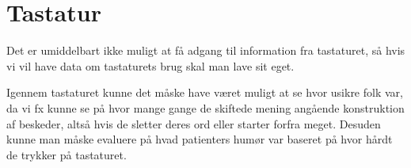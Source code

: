 \section{Tastatur}
Det er umiddelbart ikke muligt at få adgang til information fra tastaturet, så hvis vi vil have data om tastaturets brug skal man lave sit eget.

Igennem tastaturet kunne det måske have været muligt at se hvor usikre folk var, da vi fx kunne se på hvor mange gange de skiftede mening angående konstruktion af beskeder, altså hvis de sletter deres ord eller starter forfra meget.
Desuden kunne man måske evaluere på hvad patienters humør var baseret på hvor hårdt de trykker på tastaturet.

\begin{comment}
Idéer til tastatur:
\begin{description}[style=nextline]
\item[Antal Rettelser]
\item[Ordbrug]
\item[Tid for en sætning]
\item[Tryk niveau]
\end{description}

Sensor
\begin{description}[style=nextline]
\item[Kan vi få fat i data?] Lyder som om det ikke er muligt at keylogge globalt. Man kan lave sit eget tastatur som erstatter default tastatur og keylogge derfra, men det lyder ikke til at det er muligt at lave en Service keylogger som får fat i alt som bliver skrevet på devicet.
\item[Er der begrænsninger?] Det lyder til at man bliver nødt til at lave sit eget tastatur.
\item[Hvilke data giver sensoren?] N/A
\end{description}

Da vi ikke tror det er praktisk kan denne nok blive udelukket som en mulighed og vi vil derfor ikke forsætte med analysen.

Analyse
\begin{description}[style=nextline]
\item[Har vi data nok?]
\item[Hvilke data skal benyttes?]
\item[Formål med analysen]
\item[Ide til visualisering (?)]
\item[(kort oprids af fremgangsmåde)]
\item[(gem illustrationer og kilder)]
\end{description}
\end{comment}




